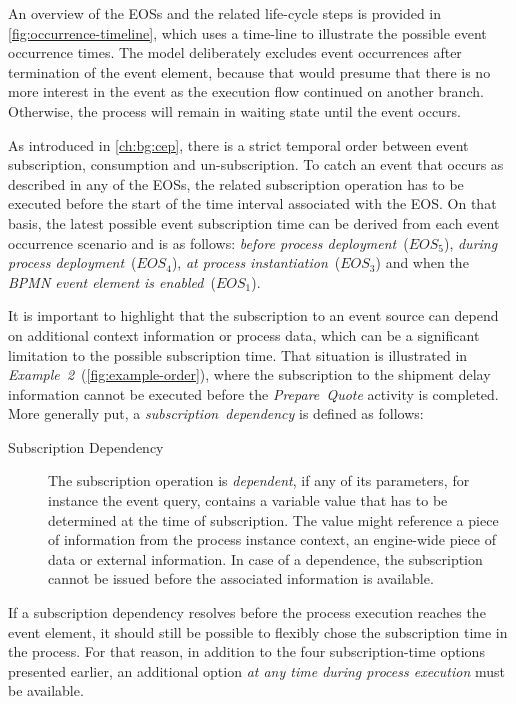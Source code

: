 \noindent An overview of the EOSs and the related life-cycle steps is provided in \autoref{fig:occurrence-timeline}, which uses a time-line to illustrate the possible event occurrence times.
The model deliberately excludes event occurrences after termination of the event element, because that would presume that there is no more interest in the event as the execution flow continued on another branch. Otherwise, the process will remain in waiting state until the event occurs.

As introduced in \autoref{ch:bg:cep}, there is a strict temporal order between event subscription, consumption and un-subscription.
To catch an event that occurs as described in any of the EOSs, the related subscription operation has to be executed before the start of the time interval associated with the EOS.
On that basis, the latest possible event subscription time can be derived from each event occurrence scenario and is as follows:
\textit{before process deployment}~($EOS_{5}$), \textit{during process deployment}~($EOS_{4}$), \textit{at process instantiation}~($EOS_{3}$) and when the \textit{BPMN event element is enabled}~($EOS_{1}$).

It is important to highlight that the subscription to an event source can depend on additional context information or process data, which can be a significant limitation to the possible subscription time.
That situation is illustrated in \textit{Example~2}~(\autoref{fig:example-order}), where the subscription to the shipment delay information cannot be executed before the \textit{Prepare~Quote} activity is completed.
More generally put, a \textit{subscription~dependency} is defined as follows:

\begin{description}
	\item[Subscription Dependency]
	The subscription operation is \textit{dependent}, if any of its parameters, for instance the event query, contains a variable value that has to be determined at the time of subscription.
	The value might reference a piece of information from the process instance context, an engine-wide piece of data or external information.
	In case of a dependence, the subscription cannot be issued before the associated information is available.
\end{description}

If a subscription dependency resolves before the process execution reaches the event element, it should still be possible to flexibly chose the subscription time in the process.
For that reason, in addition to the four subscription-time options presented earlier, an additional option \textit{at any time during process execution} must be available.


